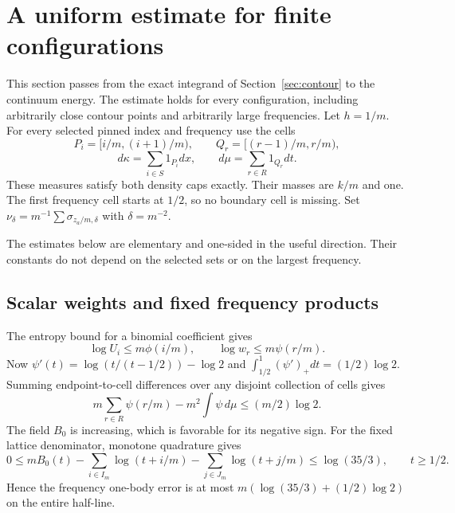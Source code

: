 \section{A uniform estimate for finite configurations}\label{sec:configuration}

This section passes from the exact integrand of Section~\ref{sec:contour}
to the continuum energy. The estimate holds for every configuration,
including arbitrarily close contour points and arbitrarily large
frequencies. Let \(h=1/m\). For every selected pinned index and frequency
use the cells
\[
 P_i=[i/m,(i+1)/m),\qquad Q_r=[(r-1)/m,r/m),
\]
\begin{equation}\label{eq:config-cells}
 d\kappa=\sum_{i\in S}1_{P_i}dx,\qquad
 d\mu=\sum_{r\in R}1_{Q_r}dt.
\end{equation}
These measures satisfy both density caps exactly. Their masses are \(k/m\)
and one. The first frequency cell starts at \(1/2\), so no boundary cell is
missing. Set \(\nu_\delta=m^{-1}\sum\sigma_{z_a/m,\delta}\) with
\(\delta=m^{-2}\).

The estimates below are elementary and one-sided in the useful direction.
Their constants do not depend on the selected sets or on the largest
frequency.

\subsection{Scalar weights and fixed frequency products}
The entropy bound for a binomial coefficient gives
\[
 \log U_i\le m\phi(i/m),\qquad \log w_r\le m\psi(r/m).
\]
Now \(\psi'(t)=\log(t/(t-1/2))-\log2\) and
\(\int_{1/2}^1(\psi')_+dt=(1/2)\log2\). Summing endpoint-to-cell
differences over any disjoint collection of cells gives
\begin{equation}\label{eq:config-psi}
 m\sum_{r\in R}\psi(r/m)-m^2\int\psi\,d\mu
 \le (m/2)\log2.
\end{equation}
The field \(B_0\) is increasing, which is favorable for its negative sign.
For the fixed lattice denominator, monotone quadrature gives
\begin{equation}\label{eq:config-Bzero}
 0\le mB_0(t)-\sum_{i\in I_m}\log(t+i/m)
                   -\sum_{j\in J_m}\log(t+j/m)
 \le\log(35/3),\qquad t\ge1/2.
\end{equation}
Hence the frequency one-body error is at most
\(m(\log(35/3)+(1/2)\log2)\) on the entire half-line.

